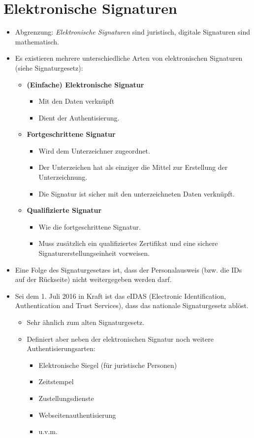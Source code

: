 \section{Elektronische Signaturen}
	\begin{itemize}
		\item Abgrenzung: \textit{Elektronische Signaturen} sind juristisch, digitale Signaturen sind mathematisch.
		\item Es existieren mehrere unterschiedliche Arten von elektronischen Signaturen (siehe Signaturgesetz):
			\begin{itemize}
				\item \textbf{(Einfache) Elektronische Signatur}
					\begin{itemize}
						\item Mit den Daten verknüpft
						\item Dient der Authentisierung.
					\end{itemize}
				\item \textbf{Fortgeschrittene Signatur}
					\begin{itemize}
						\item Wird dem Unterzeichner zugeordnet.
						\item Der Unterzeichen hat als einziger die Mittel zur Erstellung der Unterzeichnung.
						\item Die Signatur ist sicher mit den unterzeichneten Daten verknüpft.
					\end{itemize}
				\item \textbf{Qualifizierte Signatur}
					\begin{itemize}
						\item Wie die fortgeschrittene Signatur.
						\item Muss zusätzlich ein qualifiziertes Zertifikat und eine sichere Signaturerstellungseinheit vorweisen.
					\end{itemize}
			\end{itemize}
		\item Eine Folge des Signaturgesetzes ist, dass der Personalausweis (bzw. die IDs auf der Rückseite) nicht weitergegeben werden darf.
		\item Sei dem 1. Juli 2016 in Kraft ist das eIDAS (Electronic Identification, Authentication and Trust Services), dass das nationale Signaturgesetz ablöst.
			\begin{itemize}
				\item Sehr ähnlich zum alten Signaturgesetz.
				\item Definiert aber neben der elektronischen Signatur noch weitere Authentisierungsarten:
					\begin{itemize}
						\item Elektronische Siegel (für juristische Personen)
						\item Zeitstempel
						\item Zustellungsdienste
						\item Webseitenauthentisierung
						\item u.v.m.
					\end{itemize}
			\end{itemize}
	\end{itemize}

